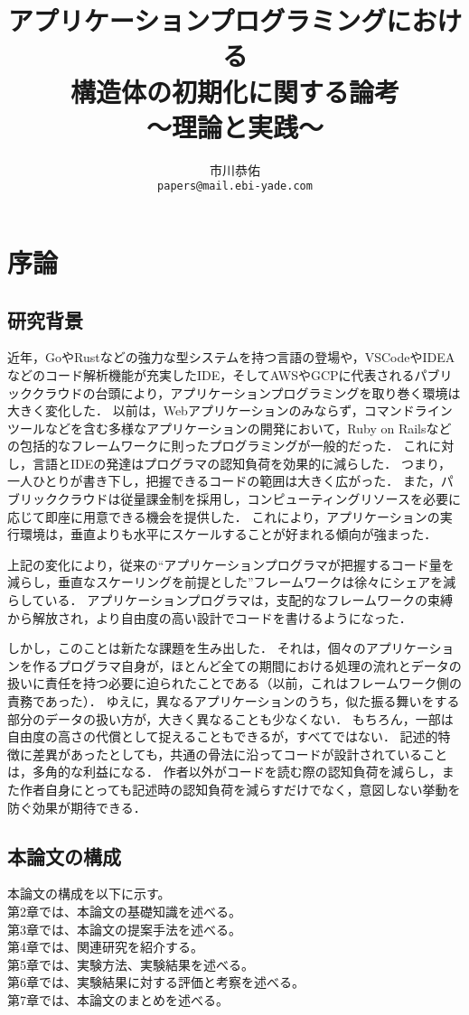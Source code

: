 \documentclass[a4paper,12pt]{jsreport}
\title{
\LARGE{アプリケーションプログラミングにおける\\構造体の初期化に関する論考}\\
\Large{〜理論と実践〜}
}
\author{市川恭佑\\\texttt{papers@mail.ebi-yade.com}}
\date{}
\begin{document}
\maketitle
{}
\tableofcontents
\newpage
\listoffigures
\listoftables
\newpage
{}
\newpage

\chapter{序論}
\section{研究背景}
近年，GoやRustなどの強力な型システムを持つ言語の登場や，VSCodeやIDEAなどのコード解析機能が充実したIDE，そしてAWSやGCPに代表されるパブリッククラウドの台頭により，アプリケーションプログラミングを取り巻く環境は大きく変化した．
以前は，Webアプリケーションのみならず，コマンドラインツールなどを含む多様なアプリケーションの開発において，Ruby on Railsなどの包括的なフレームワークに則ったプログラミングが一般的だった．
これに対し，言語とIDEの発達はプログラマの認知負荷を効果的に減らした．
つまり，一人ひとりが書き下し，把握できるコードの範囲は大きく広がった．
また，パブリッククラウドは従量課金制を採用し，コンピューティングリソースを必要に応じて即座に用意できる機会を提供した．
これにより，アプリケーションの実行環境は，垂直よりも水平にスケールすることが好まれる傾向が強まった．
\par
上記の変化により，従来の``アプリケーションプログラマが把握するコード量を減らし，垂直なスケーリングを前提とした''フレームワークは徐々にシェアを減らしている．
アプリケーションプログラマは，支配的なフレームワークの束縛から解放され，より自由度の高い設計でコードを書けるようになった．
\par
しかし，このことは新たな課題を生み出した．
それは，個々のアプリケーションを作るプログラマ自身が，ほとんど全ての期間における処理の流れとデータの扱いに責任を持つ必要に迫られたことである（以前，これはフレームワーク側の責務であった）．
ゆえに，異なるアプリケーションのうち，似た振る舞いをする部分のデータの扱い方が，大きく異なることも少なくない．
もちろん，一部は自由度の高さの代償として捉えることもできるが，すべてではない．
記述的特徴に差異があったとしても，共通の骨法に沿ってコードが設計されていることは，多角的な利益になる．
作者以外がコードを読む際の認知負荷を減らし，また作者自身にとっても記述時の認知負荷を減らすだけでなく，意図しない挙動を防ぐ効果が期待できる．

\section{本論文の構成}
本論文の構成を以下に示す。\\
第2章では、本論文の基礎知識を述べる。\\
第3章では、本論文の提案手法を述べる。\\
第4章では、関連研究を紹介する。\\
第5章では、実験方法、実験結果を述べる。\\
第6章では、実験結果に対する評価と考察を述べる。\\
第7章では、本論文のまとめを述べる。
\end{document}
